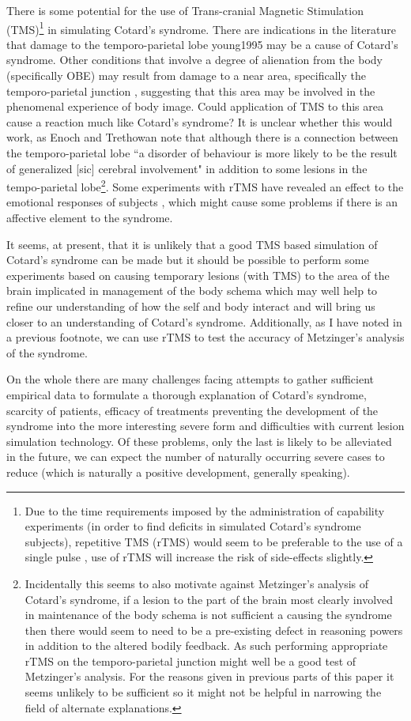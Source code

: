 There is some potential for the use of Trans-cranial Magnetic Stimulation (TMS)\footnote{Due to the time requirements imposed by the administration of capability experiments (in order to find deficits in simulated Cotard's syndrome subjects), repetitive TMS (rTMS) would seem to be preferable to the use of a single pulse \cite[p. 297]{weiner2003handbook}, use of rTMS will increase the risk of side-effects slightly.} in simulating Cotard's syndrome. There are indications in the literature that damage to the temporo-parietal lobe \cite{enoch1991}{young1995} may be a cause of Cotard's syndrome. Other conditions that involve a degree of alienation from the body (specifically OBE) may result from damage to a near area, specifically the temporo-parietal junction \cite{blanke2005}, suggesting that this area may be involved in the phenomenal experience of body image. Could application of TMS to this area cause a reaction much like Cotard's syndrome? It is unclear whether this would work, as Enoch and Trethowan note that although there is a connection between the temporo-parietal lobe ``a disorder of behaviour is more likely to be the result of generalized [sic] cerebral involvement" \cite[p. 177]{enoch1991} in addition to some lesions in the tempo-parietal lobe\footnote{Incidentally this seems to also motivate against Metzinger's analysis of Cotard's syndrome, if a lesion to the part of the brain most clearly involved in maintenance of the body schema is not sufficient a causing the syndrome then there would seem to need to be a pre-existing defect in reasoning powers in addition to the altered bodily feedback. As such performing appropriate rTMS on the temporo-parietal junction might well be a good test of Metzinger's analysis. For the reasons given in previous parts of this paper it seems  unlikely to be sufficient so it might not be helpful in narrowing the field of alternate explanations.}. Some experiments with rTMS have revealed an effect to the emotional responses of subjects \cite{wasserman2000}, which might cause some problems if there is an affective element to the syndrome.

It seems, at present, that it is unlikely that a good TMS based simulation of Cotard's syndrome can be made but it should be possible to perform some experiments based on causing temporary lesions (with TMS) to the area of the brain implicated in management of the body schema which may well help to refine our understanding of how the self and body interact and will bring us closer to an understanding of Cotard's syndrome. Additionally, as I have noted in a previous footnote, we can use rTMS to test the accuracy of Metzinger's analysis of the syndrome.

On the whole there are many challenges facing attempts to gather sufficient empirical data to formulate a thorough explanation of Cotard's syndrome, scarcity of patients, efficacy of treatments preventing the development of the syndrome into the more interesting severe form and difficulties with current lesion simulation technology. Of these problems, only the last is likely to be alleviated in the future, we can expect the number of naturally occurring severe cases to reduce (which is naturally a positive development, generally speaking).